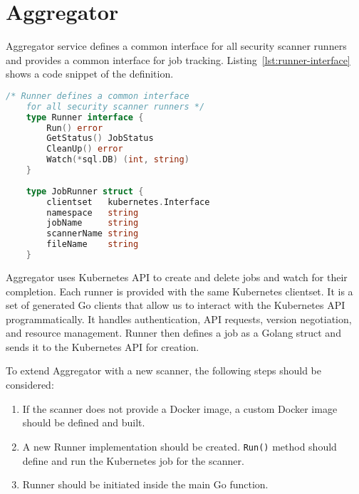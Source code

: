 \section{Aggregator}
\label{sec:aggregator}

Aggregator service defines a common interface for all security scanner runners and provides a common interface for job tracking. Listing~\ref{lst:runner-interface} shows a code snippet of the definition.

\begin{lstlisting}[language=Go, caption={[A common inteface for runners] A common inteface for runners.}, label={lst:runner-interface}]
    /* Runner defines a common interface 
    for all security scanner runners */
    type Runner interface {
        Run() error
        GetStatus() JobStatus
        CleanUp() error
        Watch(*sql.DB) (int, string)
    }
    
    type JobRunner struct {
        clientset   kubernetes.Interface
        namespace   string
        jobName     string
        scannerName string
        fileName    string
    }
\end{lstlisting}

Aggregator uses Kubernetes API to create and delete jobs and watch for their completion. Each runner is provided with the same Kubernetes clientset. It is a set of generated Go clients that allow us to interact with the Kubernetes API programmatically. It handles authentication, API requests, version negotiation, and resource management. Runner then defines a job as a Golang struct and sends it to the Kubernetes API for creation.

To extend Aggregator with a new scanner, the following steps should be considered:
\begin{enumerate}
    \item If the scanner does not provide a Docker image, a custom Docker image should be defined and built.
    \item A new Runner implementation should be created. \lstinline{Run()} method should define and run the Kubernetes job for the scanner.
    \item Runner should be initiated inside the main Go function.
\end{enumerate}